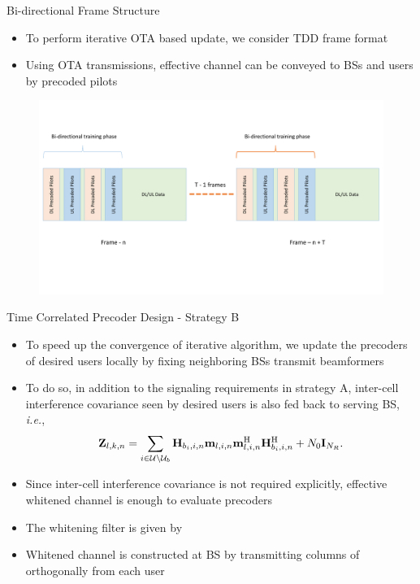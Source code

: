 \documentclass[9pt]{beamer}
\begin{document}
\begin{frame}{Bi-directional Frame Structure}
	\begin{itemize}
		\item To perform iterative \ac{OTA} based update, we \textcolor[rgb]{0.7,0,0}{consider \ac{TDD} frame format}
		\item Using \ac{OTA} transmissions, \textcolor[rgb]{0,0.6,0}{effective channel can be conveyed to \acp{BS} and users by precoded pilots}
	\end{itemize}
	\begin{figure}
		\centering
		\includegraphics[trim=4mm 40mm 10mm 10mm,clip, width=\columnwidth ]{bit_model.pdf}
		\label{fig-a}
	\end{figure}
\end{frame}

\begin{frame}{Time Correlated Precoder Design - Strategy B}
	\begin{itemize}
		\item To \alert{speed up the convergence} of iterative algorithm, we update the precoders of desired users \textcolor[rgb]{0,0.6,0}{locally by fixing neighboring \acp{BS} transmit beamformers}
		\item To do so, in addition to the signaling requirements in strategy A, \textcolor[rgb]{0,0,0.6}{inter-cell interference covariance seen by desired users} is also fed back to serving \ac{BS}, \textit{i.e.},
		\begin{equation}
		\mathbf{Z}_{l,k,n} = \sum_{i \in \mathcal{U} \backslash \mathcal{U}_b} \mathbf{H}_{b_i,i,n} \mathbf{m}_{l,i,n} \mathbf{m}_{l,i,n}^{\mathrm{H}} \mathbf{H}_{b_i,i,n}^{\mathrm{H}} + N_0 \mathbf{I}_{N_R}.
		\end{equation}
		\item Since inter-cell interference covariance is not required explicitly, \textcolor[rgb]{0.6,0,0}{effective whitened channel is enough to evaluate precoders}
		\item The whitening filter  is given by 
		\item Whitened channel is constructed at \ac{BS} by \textcolor[rgb]{0,0.6,0}{transmitting columns of  orthogonally from each user}
	\end{itemize}	
\end{frame}
\end{document}
